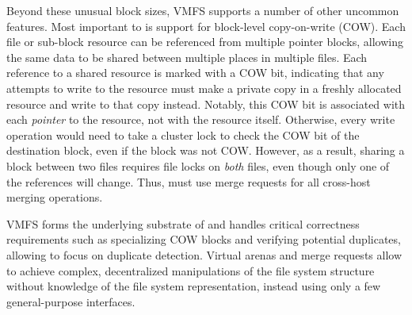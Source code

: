 Beyond these unusual block sizes, VMFS supports a number of other
uncommon features.  Most important to \DeDe is support for block-level
copy-on-write (COW).  Each file or sub-block resource can be
referenced from multiple pointer blocks, allowing the same data to be
shared between multiple places in multiple files.  Each reference to a
shared resource is marked with a COW bit, indicating that any attempts
to write to the resource must make a private copy in a freshly
allocated resource and write to that copy instead.  Notably, this COW
bit is associated with each \emph{pointer} to the resource, not with the
resource itself.  Otherwise, every write operation would need to take
a cluster lock to check the COW bit of the destination block, even if
the block was not COW.  However, as a result, sharing a block between
two files requires file locks on \emph{both} files, even though only
one of the references will change.  Thus, \DeDe must use merge
requests for all cross-host merging operations.

VMFS forms the underlying substrate of \DeDe and handles critical
correctness requirements such as specializing COW blocks and
verifying potential duplicates, allowing \DeDe to focus on
duplicate detection.  Virtual arenas and merge requests
allow \DeDe to achieve complex, decentralized manipulations of the
file system structure without knowledge of the file system
representation, instead using only a few general-purpose interfaces.



